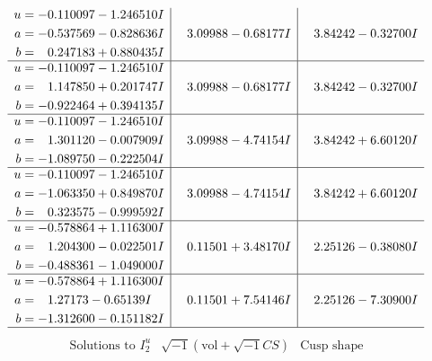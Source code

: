 \documentclass[1p]{elsarticle_modified}
\theoremstyle{definition}
\newcommand{\I}{\sqrt{-1}}
\begin{document}
$$\begin{array}{c|c|c}
\begin{aligned}
u &= -0.110097 - 1.246510 I \\
a &= -0.537569 - 0.828636 I \\
b &= \phantom{-}0.247183 + 0.880435 I\end{aligned}
 & \phantom{-}3.09988 - 0.68177 I & \phantom{-}3.84242 - 0.32700 I \\ \hline\begin{aligned}
u &= -0.110097 - 1.246510 I \\
a &= \phantom{-}1.147850 + 0.201747 I \\
b &= -0.922464 + 0.394135 I\end{aligned}
 & \phantom{-}3.09988 - 0.68177 I & \phantom{-}3.84242 - 0.32700 I \\ \hline\begin{aligned}
u &= -0.110097 - 1.246510 I \\
a &= \phantom{-}1.301120 - 0.007909 I \\
b &= -1.089750 - 0.222504 I\end{aligned}
 & \phantom{-}3.09988 - 4.74154 I & \phantom{-}3.84242 + 6.60120 I \\ \hline\begin{aligned}
u &= -0.110097 - 1.246510 I \\
a &= -1.063350 + 0.849870 I \\
b &= \phantom{-}0.323575 - 0.999592 I\end{aligned}
 & \phantom{-}3.09988 - 4.74154 I & \phantom{-}3.84242 + 6.60120 I \\ \hline\begin{aligned}
u &= -0.578864 + 1.116300 I \\
a &= \phantom{-}1.204300 - 0.022501 I \\
b &= -0.488361 - 1.049000 I\end{aligned}
 & \phantom{-}0.11501 + 3.48170 I & \phantom{-}2.25126 - 0.38080 I \\ \hline\begin{aligned}
u &= -0.578864 + 1.116300 I \\
a &= \phantom{-}1.27173 - 0.65139 I \\
b &= -1.312600 - 0.151182 I\end{aligned}
 & \phantom{-}0.11501 + 7.54146 I & \phantom{-}2.25126 - 7.30900 I\\
 \hline 
 \end{array}$$\newpage$$\begin{array}{c|c|c}  
\text{Solutions to }I^u_{2}& \I (\text{vol} + \sqrt{-1}CS) & \text{Cusp shape}\\

\end{array}$$
\end{document}
